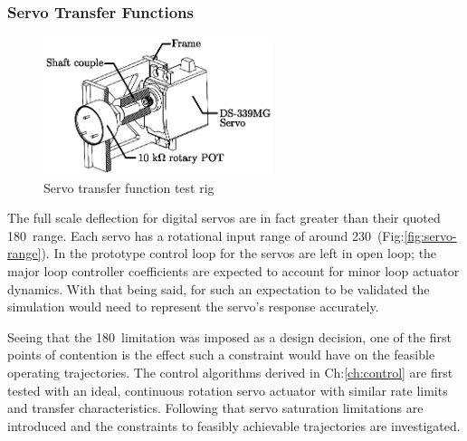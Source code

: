 \subsubsection*{Servo Transfer Functions}
\begin{figure}[htbp]
\centering
\includegraphics[width=0.6\textwidth]{figs/servo-position}
\caption{Servo transfer function test rig}
\label{fig:servo-position}
\end{figure}
The full scale deflection for digital servos are in fact greater than their quoted 180\textdegree ~range. Each servo has a rotational input range of around 230\textdegree ~(Fig:\ref{fig:servo-range}). In the prototype control loop for the servos are left in open loop; the major loop controller coefficients are expected to account for minor loop actuator dynamics. With that being said, for such an expectation to be validated the simulation would need to represent the servo's response accurately. 
\par
Seeing that the 180\textdegree ~limitation was imposed as a design decision, one of the first points of contention is the effect such a constraint would have on the feasible operating trajectories. The control algorithms derived in Ch:\ref{ch:control} are first tested with an ideal, continuous rotation servo actuator with similar rate limits and transfer characteristics. Following that servo saturation limitations are introduced and the constraints to feasibly achievable trajectories are investigated.
